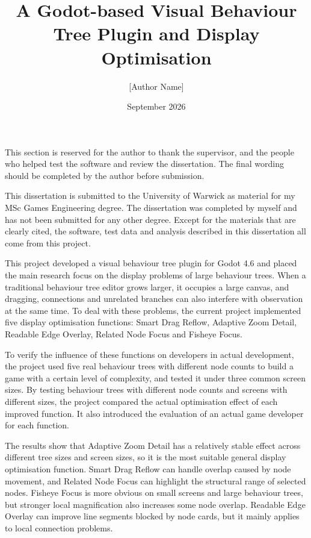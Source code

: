 \documentclass[11pt,a4paper,oneside,extrafontsizes]{memoir}
\title{A Godot-based Visual Behaviour Tree Plugin and Display Optimisation}
\author{[Author Name]}
\date{September 2026}
\begin{document}
\frontmatter
{}
\tableofcontents
\clearforchapter\listoffigures
\clearforchapter\listoftables


This section is reserved for the author to thank the supervisor, and the people who helped test the software and review the dissertation. The final wording should be completed by the author before submission.


This dissertation is submitted to the University of Warwick as material for my MSc Games Engineering degree. The dissertation was completed by myself and has not been submitted for any other degree. Except for the materials that are clearly cited, the software, test data and analysis described in this dissertation all come from this project.


This project developed a visual behaviour tree plugin for Godot 4.6 and placed the main research focus on the display problems of large behaviour trees. When a traditional behaviour tree editor grows larger, it occupies a large canvas, and dragging, connections and unrelated branches can also interfere with observation at the same time. To deal with these problems, the current project implemented five display optimisation functions: Smart Drag Reflow, Adaptive Zoom Detail, Readable Edge Overlay, Related Node Focus and Fisheye Focus.

To verify the influence of these functions on developers in actual development, the project used five real behaviour trees with different node counts to build a game with a certain level of complexity, and tested it under three common screen sizes. By testing behaviour trees with different node counts and screens with different sizes, the project compared the actual optimisation effect of each improved function. It also introduced the evaluation of an actual game developer for each function.

The results show that Adaptive Zoom Detail has a relatively stable effect across different tree sizes and screen sizes, so it is the most suitable general display optimisation function. Smart Drag Reflow can handle overlap caused by node movement, and Related Node Focus can highlight the structural range of selected nodes. Fisheye Focus is more obvious on small screens and large behaviour trees, but stronger local magnification also increases some node overlap. Readable Edge Overlay can improve line segments blocked by node cards, but it mainly applies to local connection problems.
\end{document}
